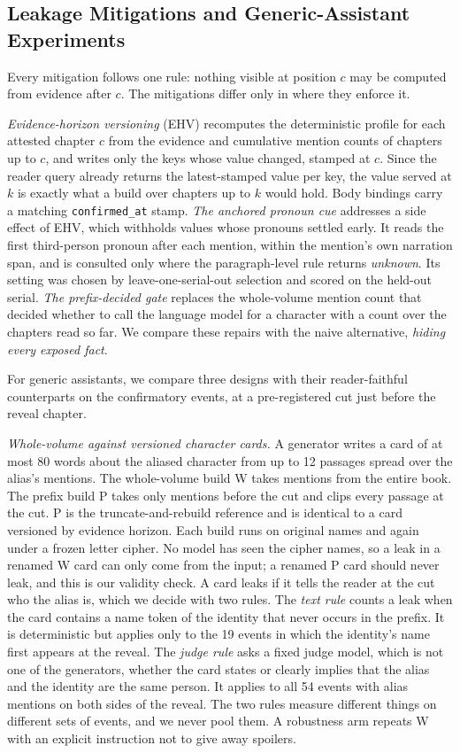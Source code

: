 \documentclass[sn-mathphys]{sn-jnl}%
\theoremstyle{thmstyleone}%
\theoremstyle{thmstyletwo}%
\theoremstyle{thmstylethree}%
\begin{document}
\subsection{Leakage Mitigations and Generic-Assistant Experiments}\label{sec:m-mitigation}

Every mitigation follows one rule: nothing visible at position $c$ may be computed from evidence after $c$. The mitigations differ only in where they enforce it.

\emph{Evidence-horizon versioning} (EHV) recomputes the deterministic profile for each attested chapter $c$ from the evidence and cumulative mention counts of chapters up to $c$, and writes only the keys whose value changed, stamped at $c$. Since the reader query already returns the latest-stamped value per key, the value served at $k$ is exactly what a build over chapters up to $k$ would hold. Body bindings carry a matching \texttt{confirmed\_at} stamp. \emph{The anchored pronoun cue} addresses a side effect of EHV, which withholds values whose pronouns settled early. It reads the first third-person pronoun after each mention, within the mention's own narration span, and is consulted only where the paragraph-level rule returns \emph{unknown}. Its setting was chosen by leave-one-serial-out selection and scored on the held-out serial. \emph{The prefix-decided gate} replaces the whole-volume mention count that decided whether to call the language model for a character with a count over the chapters read so far. We compare these repairs with the naive alternative, \emph{hiding every exposed fact}.

For generic assistants, we compare three designs with their reader-faithful counterparts on the confirmatory events, at a pre-registered cut just before the reveal chapter.

\emph{Whole-volume against versioned character cards.} A generator writes a card of at most 80 words about the aliased character from up to 12 passages spread over the alias's mentions. The whole-volume build W takes mentions from the entire book. The prefix build P takes only mentions before the cut and clips every passage at the cut. P is the truncate-and-rebuild reference and is identical to a card versioned by evidence horizon. Each build runs on original names and again under a frozen letter cipher. No model has seen the cipher names, so a leak in a renamed W card can only come from the input; a renamed P card should never leak, and this is our validity check. A card leaks if it tells the reader at the cut who the alias is, which we decide with two rules. The \emph{text rule} counts a leak when the card contains a name token of the identity that never occurs in the prefix. It is deterministic but applies only to the 19 events in which the identity's name first appears at the reveal. The \emph{judge rule} asks a fixed judge model, which is not one of the generators, whether the card states or clearly implies that the alias and the identity are the same person. It applies to all 54 events with alias mentions on both sides of the reveal. The two rules measure different things on different sets of events, and we never pool them. A robustness arm repeats W with an explicit instruction not to give away spoilers.
\end{document}
